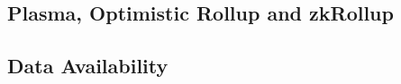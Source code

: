 \documentclass[../../thesis.tex]{subfiles}
\begin{document}




\subsection{Plasma, Optimistic Rollup and zkRollup}

\subsection{Data Availability}
\end{document}
